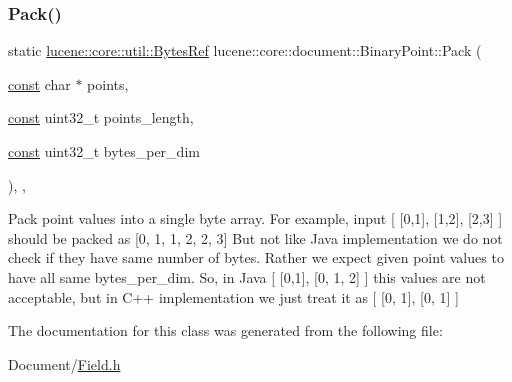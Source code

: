\mbox{\label{classlucene_1_1core_1_1document_1_1BinaryPoint_a3dd125364391f40b4cc114c3a099542e}} 
\subsubsection{\texorpdfstring{Pack()}{Pack()}}
{\footnotesize\ttfamily static \mbox{\hyperlink{classlucene_1_1core_1_1util_1_1BytesRef}{lucene\+::core\+::util\+::\+Bytes\+Ref}} lucene\+::core\+::document\+::\+Binary\+Point\+::\+Pack (\begin{DoxyParamCaption}\item[{\mbox{\hyperlink{ZlibCrc32_8h_a2c212835823e3c54a8ab6d95c652660e}{const}} char $\ast$}]{points,  }\item[{\mbox{\hyperlink{ZlibCrc32_8h_a2c212835823e3c54a8ab6d95c652660e}{const}} uint32\+\_\+t}]{points\+\_\+length,  }\item[{\mbox{\hyperlink{ZlibCrc32_8h_a2c212835823e3c54a8ab6d95c652660e}{const}} uint32\+\_\+t}]{bytes\+\_\+per\+\_\+dim }\end{DoxyParamCaption})\hspace{0.3cm}{\ttfamily [inline]}, {\ttfamily [static]}, {\ttfamily [private]}}

Pack point values into a single byte array. For example, input \mbox{[} \mbox{[}0,1\mbox{]}, \mbox{[}1,2\mbox{]}, \mbox{[}2,3\mbox{]} \mbox{]} should be packed as \mbox{[}0, 1, 1, 2, 2, 3\mbox{]} But not like Java implementation we do not check if they have same number of bytes. Rather we expect given point values to have all same bytes\+\_\+per\+\_\+dim. So, in Java \mbox{[} \mbox{[}0,1\mbox{]}, \mbox{[}0, 1, 2\mbox{]} \mbox{]} this values are not acceptable, but in C++ implementation we just treat it as \mbox{[} \mbox{[}0, 1\mbox{]}, \mbox{[}0, 1\mbox{]} \mbox{]} 

The documentation for this class was generated from the following file\+:\begin{DoxyCompactItemize}
\item 
Document/\mbox{\hyperlink{Document_2Field_8h}{Field.\+h}}\end{DoxyCompactItemize}
